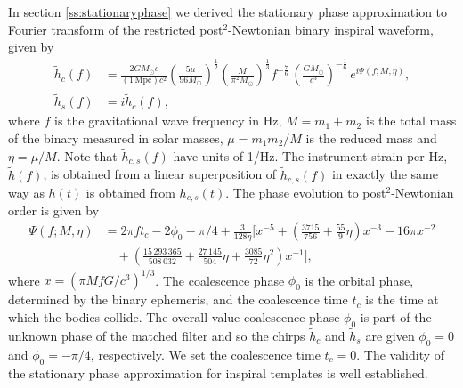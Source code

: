 In section \ref{ss:stationaryphase} we derived the stationary phase
approximation to Fourier transform of the restricted post$^2$-Newtonian binary
inspiral waveform, given by 
\begin{align}
\label{eq:spcos}
\tilde{h}_c(f)&=\frac{2GM_\odot c}{(1\,\mathrm{Mpc})c^2}
\left(\frac{5\mu}{96M_\odot}\right)^\frac{1}{2}
\left(\frac{M}{\pi^2M_\odot}\right)^\frac{1}{3}
f^{-\frac{7}{6}}\, \left( \frac{GM_\odot}{c^3} \right)^{-\frac{1}{6}}\,
e^{i\Psi(f;M,\eta)},\\
\tilde{h}_s(f)&=i\tilde{h}_c(f),
\label{eq:hsorthog}
\end{align}
where $f$ is the gravitational wave frequency in Hz, $M = m_1+m_2$ 
is the total mass of the binary measured in solar masses, $\mu = m_1 m_2 / M$
is the reduced mass and $\eta = \mu/M$.  Note that $\tilde{h}_{c,s}(f)$ have
units of 1/Hz.  The instrument strain per Hz, $\tilde{h}(f)$, is obtained from
a linear superposition of $\tilde{h}_{c,s}(f)$ in exactly the same way as
$h(t)$ is obtained from $h_{c,s}(t)$. The phase evolution to
post$^2$-Newtonian order is given by
\begin{equation}
\begin{split}
\Psi(f;M,\eta) &= 2\pi ft_c-2\phi_0-\pi/4+\frac{3}{128\eta}\biggl[x^{-5}+
\left(\frac{3715}{756}+\frac{55}{9}\eta\right)x^{-3}
-16\pi x^{-2} \\
&\quad +\left(\frac{15\,293\,365}{508\,032}+\frac{27\,145}{504}\eta
+\frac{3085}{72}\eta^2\right)x^{-1}\biggr],
\label{eq:spphase}
\end{split}
\end{equation}
where $x=(\pi M f G/c^3)^{1/3}$. The coalescence phase $\phi_0$ is the orbital
phase, determined by the binary ephemeris, and the coalescence time $t_c$ is
the time at which the bodies collide. The overall value coalescence phase
$\phi_0$ is part of the unknown phase of the matched filter and so the chirps
$\tilde{h}_c$ and $\tilde{h}_s$ are given $\phi_0=0$ and $\phi_0=-\pi/4$,
respectively.  We set the coalescence time $t_c = 0$.  The validity of the
stationary phase approximation for inspiral templates is well
established\cite{Droz:1999qx}.

